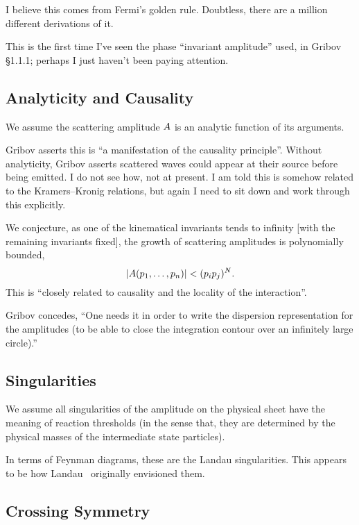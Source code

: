 I believe this comes from Fermi's golden rule. Doubtless, there are a
million different derivations of it.

 This is the first time I've seen the
phase ``invariant amplitude'' used, in Gribov \S1.1.1; perhaps I just
haven't been paying attention.

\subsection{Analyticity and Causality}
We assume the scattering amplitude $A$ is an analytic function
of its arguments.

\M
Gribov asserts this is ``a manifestation of the causality principle''.
Without analyticity, Gribov asserts scattered waves could appear at
their source before being emitted. I do not see how, not at present.
I am told this is somehow related to the Kramers--Kronig relations, but
again I need to sit down and work through this explicitly.

We conjecture, as one of the kinematical invariants tends to infinity
[with the remaining invariants fixed],
the growth of scattering amplitudes is polynomially bounded,
\begin{equation}
|A(p_{1},\dots,p_{n})|<(p_{i}p_{j})^{N}.
\end{equation}
This is ``closely related to causality and the locality of the interaction''.

Gribov concedes, ``One needs it in order to write the dispersion representation
for the amplitudes (to be able to close the integration contour over an
infinitely large circle).''

\subsection{Singularities}
We assume all singularities of the amplitude on the physical sheet have
the meaning of reaction thresholds (in the sense that, they are
determined by the physical masses of the intermediate state particles).

In terms of Feynman diagrams, these are the Landau singularities. This
appears to be how Landau~\cite{Landau:1959fi} originally envisioned them.

\subsection{Crossing Symmetry}


